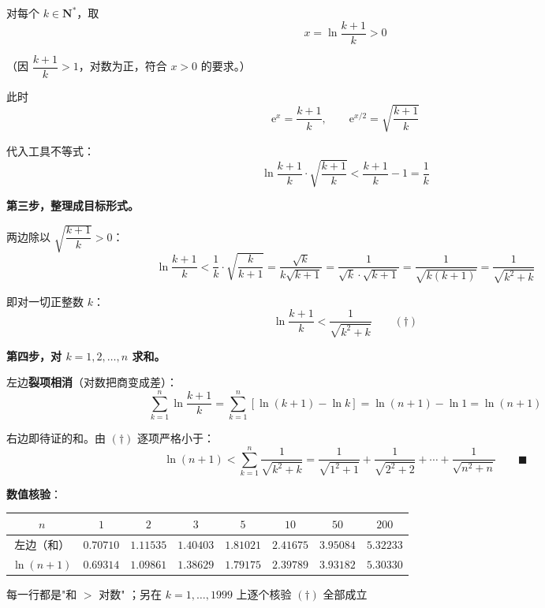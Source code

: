 \begin{answer}
对每个 $k\in\mathbf N^{*}$，取
\nopagebreak[4]
\[x=\ln\frac{k+1}k>0\]

（因 $\dfrac{k+1}k>1$，对数为正，符合 $x>0$ 的要求。）

此时
\nopagebreak[4]
\[\mathrm e^{x}=\frac{k+1}k,\qquad\mathrm e^{x/2}=\sqrt{\frac{k+1}k}\]

代入工具不等式：
\nopagebreak[4]
\[\ln\frac{k+1}k\cdot\sqrt{\frac{k+1}k}<\frac{k+1}k-1=\frac1k\]

\textbf{第三步，整理成目标形式。}

两边除以 $\sqrt{\dfrac{k+1}k}>0$：
\nopagebreak[4]
\[\ln\frac{k+1}k<\frac1k\cdot\sqrt{\frac k{k+1}}=\frac{\sqrt k}{k\sqrt{k+1}}=\frac1{\sqrt k\cdot\sqrt{k+1}}=\frac1{\sqrt{k(k+1)}}=\frac1{\sqrt{k^{2}+k}}\]

即对一切正整数 $k$：
\nopagebreak[4]
\[\ln\frac{k+1}k<\frac1{\sqrt{k^{2}+k}}\qquad(\dagger)\]

\textbf{第四步，对 $k=1,2,\dots,n$ 求和。}

左边\textbf{裂项相消}（对数把商变成差）：
\nopagebreak[4]
\[\sum_{k=1}^{n}\ln\frac{k+1}k=\sum_{k=1}^{n}\left[\ln(k+1)-\ln k\right]=\ln(n+1)-\ln1=\ln(n+1)\]

右边即待证的和。由 $(\dagger)$ 逐项严格小于：
\nopagebreak[4]
\[\ln(n+1)<\sum_{k=1}^{n}\frac1{\sqrt{k^{2}+k}}=\frac1{\sqrt{1^{2}+1}}+\frac1{\sqrt{2^{2}+2}}+\cdots+\frac1{\sqrt{n^{2}+n}}\qquad\blacksquare\]

\textbf{数值核验}：

\begin{center}
\begingroup\setlength{\tabcolsep}{4pt}
\begin{tabular}{cccccccc}
\toprule
$n$ & $1$ & $2$ & $3$ & $5$ & $10$ & $50$ & $200$ \\
\midrule
左边（和） & $0.70710$ & $1.11535$ & $1.40403$ & $1.81021$ & $2.41675$ & $3.95084$ & $5.32233$ \\
$\ln(n+1)$ & $0.69314$ & $1.09861$ & $1.38629$ & $1.79175$ & $2.39789$ & $3.93182$ & $5.30330$ \\
\bottomrule
\end{tabular}
\endgroup
\end{center}

每一行都是"和 $>$ 对数" ；另在 $k=1,\dots,1999$ 上逐个核验 $(\dagger)$ 全部成立 


\end{answer}
